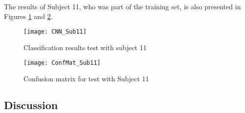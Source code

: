 \documentclass[Main]{subfiles}
\begin{document}
		The results of Subject 11, who was part of the training set, is also presented in Figures \ref{fig:Results_sub11} and \ref{fig:cnn_conf11}.

		\begin{figure}[H]
			\begin{center}
				\texttt{[image: CNN\_Sub11]}
			\end{center}
			\caption{Classification results test with subject 11}
			\label{fig:Results_sub11}
		\end{figure}

		\begin{figure}[H]
			\begin{center}
				\texttt{[image: ConfMat\_Sub11]}
			\end{center}
			\caption{Confusion matrix for test with Subject 11}
			\label{fig:cnn_conf11}
		\end{figure}

	\subsection{Discussion} %
		\label{sub:cnn_discussion}
				


	
\end{document}
